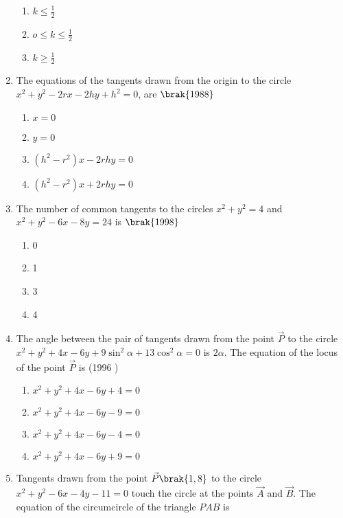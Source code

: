 \begin{enumerate}[label=\thesubsection.\arabic*.,ref=\thesubsection.\theenumi]
\begin{multicols}{4}
\begin{enumerate}
\item $k \le \frac{1}{2}$
\item $o \le k \le \frac{1}{2}$
\item $k \ge \frac{1}{2}$
\end{enumerate}
\end{multicols}
\item The equations of the tangents drawn from the origin to the circle $x^2+y^2-2rx-2hy+h^2=0$, are
    \hfill$\brak{1988}$
\begin{multicols}{2}
\begin{enumerate}
    \item $x=0$
    \item $y=0$
    \item $(h^2-r^2)x-2rhy=0$
    \item $(h^2-r^2)x+2rhy=0$
\end{enumerate}
\end{multicols}
\item The number of common tangents to the circles $x^2+y^2=4$ and $x^2+y^2-6x-8y=24$ is 
    \hfill$\brak{1998}$
\begin{multicols}{4}
\begin{enumerate}
    \item 0
    \item 1 
    \item 3
    \item 4
\end{enumerate}
\end{multicols}
    \item The angle between the pair of tangents drawn from the point $\vec{P}$ to the circle $x^{2}+y^{2}+4x-6y+9\sin^{2}{\alpha}+13\cos^{2}{\alpha}=0$ is $2\alpha$. The equation of the locus of the point $\vec{P}$ is
    \hfill {(1996 )}
\begin{multicols}{2}
\begin{enumerate}
    	\item $x^{2}+y^{2}+4x-6y+4=0$
    	\item $x^{2}+y^{2}+4x-6y-9=0$
    	\item $x^{2}+y^{2}+4x-6y-4=0$
    	\item $x^{2}+y^{2}+4x-6y+9=0$
    \end{enumerate}
\end{multicols}
         \item Tangents drawn from the point $\vec{P}\brak{1, 8}$ to the circle $x^2+y^2-6x-4y-11=0$ touch the circle at the points $\vec{A}$ and $\vec{B}$. The equation of the circumcircle of the triangle $PAB$ is

\end{enumerate}
